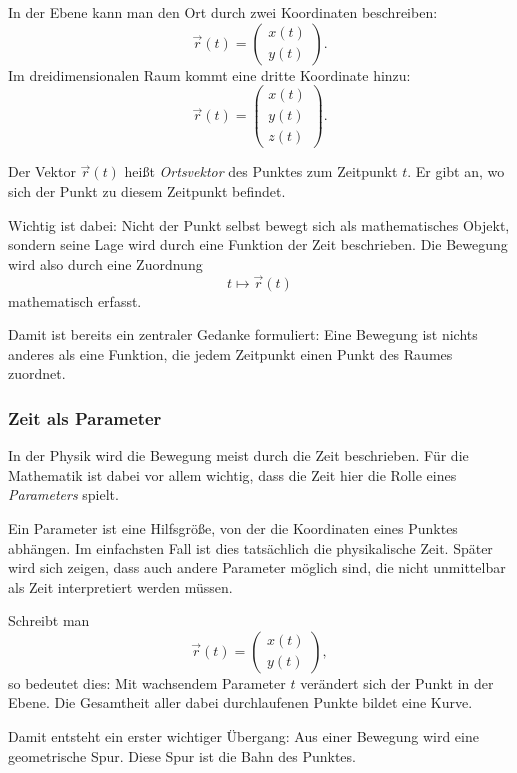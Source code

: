 In der Ebene kann man den Ort durch zwei Koordinaten beschreiben:
\[
\vec{r}(t)=
\begin{pmatrix}
	x(t)\\
	y(t)
\end{pmatrix}.
\]
Im dreidimensionalen Raum kommt eine dritte Koordinate hinzu:
\[
\vec{r}(t)=
\begin{pmatrix}
	x(t)\\
	y(t)\\
	z(t)
\end{pmatrix}.
\]

Der Vektor \(\vec{r}(t)\) heißt \emph{Ortsvektor} des Punktes zum Zeitpunkt \(t\).
Er gibt an, wo sich der Punkt zu diesem Zeitpunkt befindet.

Wichtig ist dabei:
Nicht der Punkt selbst bewegt sich als mathematisches Objekt,
sondern seine Lage wird durch eine Funktion der Zeit beschrieben.
Die Bewegung wird also durch eine Zuordnung
\[
t \longmapsto \vec{r}(t)
\]
mathematisch erfasst.

Damit ist bereits ein zentraler Gedanke formuliert:
Eine Bewegung ist nichts anderes als eine Funktion,
die jedem Zeitpunkt einen Punkt des Raumes zuordnet.


\subsubsection*{Zeit als Parameter}
In der Physik wird die Bewegung meist durch die Zeit beschrieben.
Für die Mathematik ist dabei vor allem wichtig,
dass die Zeit hier die Rolle eines \emph{Parameters} spielt.

Ein Parameter ist eine Hilfsgröße, von der die Koordinaten eines Punktes abhängen.
Im einfachsten Fall ist dies tatsächlich die physikalische Zeit.
Später wird sich zeigen, dass auch andere Parameter möglich sind,
die nicht unmittelbar als Zeit interpretiert werden müssen.

Schreibt man
\[
\vec{r}(t)=
\begin{pmatrix}
	x(t)\\
	y(t)
\end{pmatrix},
\]
so bedeutet dies:
Mit wachsendem Parameter \(t\) verändert sich der Punkt in der Ebene.
Die Gesamtheit aller dabei durchlaufenen Punkte bildet eine Kurve.

Damit entsteht ein erster wichtiger Übergang:
Aus einer Bewegung wird eine geometrische Spur.
Diese Spur ist die Bahn des Punktes.

